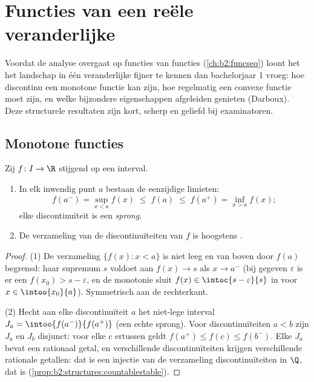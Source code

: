 \chapter{Functies van een reële veranderlijke}\label{ch:b2:realfun}

Voordat de analyse overgaat op functies van functies
(\cref{ch:b2:funcseq}) loont het het landschap in één veranderlijke
fijner te kennen dan bachelorjaar 1 vroeg: hoe discontinu een
monotone functie kan zijn, hoe regelmatig een convexe functie moet
zijn, en welke bijzondere eigenschappen afgeleiden genieten
(Darboux). Deze structurele resultaten zijn kort, scherp en geliefd
bij examinatoren.

\section{Monotone functies}

\begin{theorem}\label{thm:b2:realfun:monotone}
Zij $f \colon I \to \R$ stijgend op een interval.
\begin{enumerate}
  \item In elk inwendig punt $a$ bestaan de eenzijdige limieten:
        \[
        f(a^-) = \sup_{x < a} f(x) \;\leq\; f(a) \;\leq\;
        f(a^+) = \inf_{x > a} f(x) ;
        \]
        elke discontinuïteit is een \emph{sprong}.
  \item De verzameling van de discontinuïteiten van $f$ is
        hoogstens .
\end{enumerate}
\end{theorem}

\begin{proof}
(1) De verzameling $\{f(x) : x < a\}$ is niet leeg en van boven
door $f(a)$ begrensd: haar supremum $s$ voldoet aan $f(x) \to s$
als $x \to a^-$ (bij gegeven $\varepsilon$ is er een $f(x_0) > s -
\varepsilon$, en de monotonie sluit $f(x) \in \intoc{s -
\varepsilon}{s}$ in voor $x \in \intoo{x_0}{a}$). Symmetrisch aan
de rechterkant.

(2) Hecht aan elke discontinuïteit $a$ het niet-lege  interval
$J_a = \intoo{f(a^-)}{f(a^+)}$ (een echte sprong). Voor
discontinuïteiten $a < b$ zijn $J_a$ en $J_b$ disjunct: voor elke
$c$ ertussen geldt $f(a^+) \leq f(c) \leq f(b^-)$. Elke $J_a$ bevat
een rationaal getal, en verschillende discontinuïteiten krijgen
verschillende rationale getallen: dat is een injectie van de
verzameling discontinuïteiten in $\Q$, dat  is
(\cref{prop:b2:structures:countablestable}).
\end{proof}


